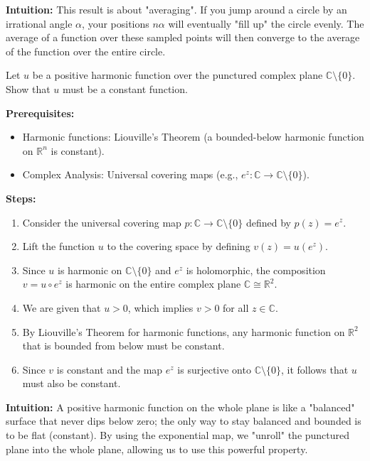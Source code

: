 \begin{solution}
\textbf{Intuition:}
This result is about "averaging". If you jump around a circle by an irrational angle $\alpha$, your positions $n\alpha$ will eventually "fill up" the circle evenly. The average of a function over these sampled points will then converge to the average of the function over the entire circle.
\end{solution}

\begin{exercise}
\label{analysis:2013:4}
Let $u$ be a positive harmonic function over the punctured complex plane $\mathbb{C}\setminus\{0\}$. Show that $u$ must be a constant function.
\end{exercise}

\begin{solution}
\textbf{Prerequisites:}
\begin{itemize}
    \item Harmonic functions: Liouville's Theorem (a bounded-below harmonic function on $\mathbb{R}^n$ is constant).
    \item Complex Analysis: Universal covering maps (e.g., $e^z : \mathbb{C} \to \mathbb{C} \setminus \{0\}$).
\end{itemize}

\textbf{Steps:}
\begin{enumerate}
    \item Consider the universal covering map $p: \mathbb{C} \to \mathbb{C} \setminus \{0\}$ defined by $p(z) = e^z$.
    \item Lift the function $u$ to the covering space by defining $v(z) = u(e^z)$.
    \item Since $u$ is harmonic on $\mathbb{C} \setminus \{0\}$ and $e^z$ is holomorphic, the composition $v = u \circ e^z$ is harmonic on the entire complex plane $\mathbb{C} \cong \mathbb{R}^2$.
    \item We are given that $u > 0$, which implies $v > 0$ for all $z \in \mathbb{C}$.
    \item By Liouville's Theorem for harmonic functions, any harmonic function on $\mathbb{R}^2$ that is bounded from below must be constant.
    \item Since $v$ is constant and the map $e^z$ is surjective onto $\mathbb{C} \setminus \{0\}$, it follows that $u$ must also be constant.
\end{enumerate}

\textbf{Intuition:}
A positive harmonic function on the whole plane is like a "balanced" surface that never dips below zero; the only way to stay balanced and bounded is to be flat (constant). By using the exponential map, we "unroll" the punctured plane into the whole plane, allowing us to use this powerful property.
\end{solution}

